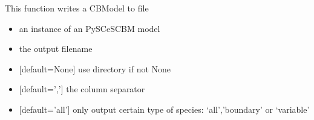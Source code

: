 \documentclass[letterpaper,10pt,english]{sphinxmanual}
\begin{document}
\begin{fulllineitems}
\label{\detokenize{modules_doc:cbmpy.CBWrite.writeSpeciesInfoToFile}}
\pysigstartsignatures
{}
\pysigstopsignatures
\sphinxAtStartPar
This function writes a CBModel to file
\begin{itemize}
\item {} 
\sphinxAtStartPar
{} an instance of an PySCeSCBM model

\item {} 
\sphinxAtStartPar
{} the output filename

\item {} 
\sphinxAtStartPar
{} {[}default=None{]} use directory if not None

\item {} 
\sphinxAtStartPar
{} {[}default=’,’{]} the column separator

\item {} 
\sphinxAtStartPar
{} {[}default=’all’{]} only output certain type of species: ‘all’,’boundary’ or ‘variable’

\end{itemize}

\end{fulllineitems}

\end{document}
